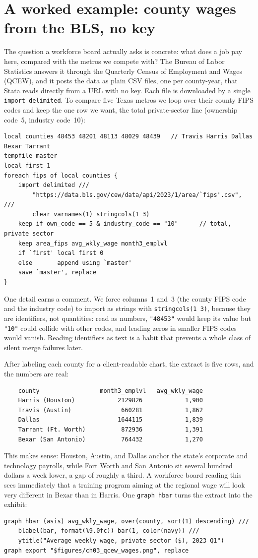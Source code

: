 \documentclass[
    a4paper,
    fontsize=10pt,
    twoside=true,
    numbers=noenddot,
]{kaobook}
\begin{document}
\section{A worked example: county wages from the BLS, no key}\label{sec:qcew}
The question a workforce board actually asks is concrete: what does a job pay here, compared with the metros we compete with? The Bureau of Labor Statistics answers it through the Quarterly Census of Employment and Wages (QCEW), and it posts the data as plain CSV files, one per county-year, that Stata reads directly from a URL with no key. Each file is downloaded by a single \texttt{import delimited}. To compare five Texas metros we loop over their county FIPS codes and keep the one row we want, the total private-sector line (ownership code~5, industry code~10):
{\footnotesize
\begin{verbatim}
local counties 48453 48201 48113 48029 48439   // Travis Harris Dallas Bexar Tarrant
tempfile master
local first 1
foreach fips of local counties {
    import delimited ///
        "https://data.bls.gov/cew/data/api/2023/1/area/`fips'.csv", ///
        clear varnames(1) stringcols(1 3)
    keep if own_code == 5 & industry_code == "10"      // total, private sector
    keep area_fips avg_wkly_wage month3_emplvl
    if `first' local first 0
    else       append using `master'
    save `master', replace
}
\end{verbatim}
}
One detail earns a comment. We force columns~1 and~3 (the county FIPS code and the industry code) to import as strings with \texttt{stringcols(1 3)}, because they are identifiers, not quantities: read as numbers, \texttt{"48453"} would keep its value but \texttt{"10"} could collide with other codes, and leading zeros in smaller FIPS codes would vanish. Reading identifiers as text is a habit that prevents a whole class of silent merge failures later.

After labeling each county for a client-readable chart, the extract is five rows, and the numbers are real:
{\footnotesize
\begin{verbatim}
    county                 month3_emplvl   avg_wkly_wage
    Harris (Houston)            2129826            1,900
    Travis (Austin)              660281            1,862
    Dallas                      1644115            1,839
    Tarrant (Ft. Worth)          872936            1,391
    Bexar (San Antonio)          764432            1,270
\end{verbatim}
}
This makes sense: Houston, Austin, and Dallas anchor the state's corporate and technology payrolls, while Fort Worth and San Antonio sit several hundred dollars a week lower, a gap of roughly a third. A workforce board reading this sees immediately that a training program aiming at the regional wage will look very different in Bexar than in Harris. One \texttt{graph hbar} turns the extract into the exhibit:
{\footnotesize
\begin{verbatim}
graph hbar (asis) avg_wkly_wage, over(county, sort(1) descending) ///
    blabel(bar, format(%9.0fc)) bar(1, color(navy)) ///
    ytitle("Average weekly wage, private sector ($), 2023 Q1")
graph export "$figures/ch03_qcew_wages.png", replace
\end{verbatim}
}
\end{document}
